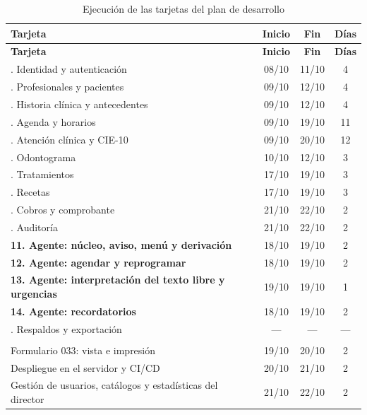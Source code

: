 \begingroup
\fontsize{9}{11}\selectfont
\renewcommand{\arraystretch}{1.2}
\setlength{\LTpre}{0pt}\setlength{\LTpost}{6pt}
\setlength{\tabcolsep}{4pt}
\begin{xltabular}{\linewidth}{|>{\raggedright\arraybackslash}X|c|c|c|}
\caption{Ejecución de las tarjetas del plan de desarrollo}
\label{tab:ob3_tarjetas} \\
\hline
\textbf{Tarjeta} & \textbf{Inicio} & \textbf{Fin} & \textbf{Días} \\ \hline
\endfirsthead
\hline
\textbf{Tarjeta} & \textbf{Inicio} & \textbf{Fin} & \textbf{Días} \\ \hline
{}. Identidad y autenticación & 08/10 & 11/10 & 4 \\ . Profesionales y pacientes & 09/10 & 12/10 & 4 \\ . Historia clínica y antecedentes & 09/10 & 12/10 & 4 \\ . Agenda y horarios & 09/10 & 19/10 & 11 \\ . Atención clínica y CIE-10 & 09/10 & 20/10 & 12 \\ . Odontograma & 10/10 & 12/10 & 3 \\ . Tratamientos & 17/10 & 19/10 & 3 \\ . Recetas & 17/10 & 19/10 & 3 \\ . Cobros y comprobante & 21/10 & 22/10 & 2 \\ . Auditoría & 21/10 & 22/10 & 2 \\ \hline
\textbf{11. Agente: núcleo, aviso, menú y derivación} & 18/10 & 19/10 & 2 \\ \hline
\textbf{12. Agente: agendar y reprogramar} & 18/10 & 19/10 & 2 \\ \hline
\textbf{13. Agente: interpretación del texto libre y urgencias} & 19/10 & 19/10 & 1 \\ \hline
\textbf{14. Agente: recordatorios} & 18/10 & 19/10 & 2 \\ . Respaldos y exportación & --- & --- & --- \\ \hline
{} \\ \hline
Formulario 033: vista e impresión & 19/10 & 20/10 & 2 \\ \hline
Despliegue en el servidor y CI/CD & 20/10 & 21/10 & 2 \\ \hline
Gestión de usuarios, catálogos y estadísticas del director & 21/10 & 22/10 & 2 \\ \hline
\end{xltabular}
\endgroup

